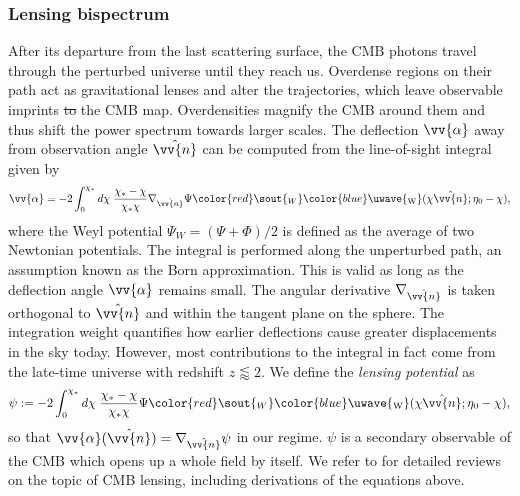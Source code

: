 \documentclass[a4paper,12pt,times,custombib,print,index]{Classes/PhDThesisPSnPDF} %
\providecommand{\DIFadd}[1]{{\protect\color{blue}\uwave{#1}}} %
\providecommand{\DIFdel}[1]{{\protect\color{red}\sout{#1}}}                      %
\providecommand{\DIFaddbegin}{} %
\providecommand{\DIFaddend}{} %
\providecommand{\DIFdelbegin}{} %
\providecommand{\DIFdelend}{} %
\newcommand{\DIFscaledelfig}{0.5}
\newlength{\DIFdelgraphicswidth} %
\newlength{\DIFdelgraphicsheight} %
\newcommand{\DIFaddincludegraphics}[2][]{{\color{blue}\fbox{\DIFOincludegraphics[#1]{#2}}}} %
\newcommand{\DIFdelincludegraphics}[2][]{%
\sbox{\DIFdelgraphicsbox}{\DIFOincludegraphics[#1]{#2}}%
\settoboxwidth{\DIFdelgraphicswidth}{\DIFdelgraphicsbox} %
\settoboxtotalheight{\DIFdelgraphicsheight}{\DIFdelgraphicsbox} %
\scalebox{\DIFscaledelfig}{%
\parbox[b]{\DIFdelgraphicswidth}{\usebox{\DIFdelgraphicsbox}\\[-\baselineskip] \rule{\DIFdelgraphicswidth}{0em}}\llap{\resizebox{\DIFdelgraphicswidth}{\DIFdelgraphicsheight}{%
\setlength{\unitlength}{\DIFdelgraphicswidth}%
\begin{picture}(1,1)%
\thicklines\linethickness{2pt} %
{\color[rgb]{1,0,0}\put(0,0){\framebox(1,1){}}}%
{\color[rgb]{1,0,0}\put(0,0){\line( 1,1){1}}}%
{\color[rgb]{1,0,0}\put(0,1){\line(1,-1){1}}}%
\end{picture}%
}\hspace*{3pt}}} %
} %
\DeclareRobustCommand{\DIFaddbegin}{\DIFOaddbegin \let\includegraphics\DIFaddincludegraphics} %
\DeclareRobustCommand{\DIFaddend}{\DIFOaddend \let\includegraphics\DIFOincludegraphics} %
\DeclareRobustCommand{\DIFdelbegin}{\DIFOdelbegin \let\includegraphics\DIFdelincludegraphics} %
\DeclareRobustCommand{\DIFdelend}{\DIFOaddend \let\includegraphics\DIFOincludegraphics} %
\begin{document}
\subsubsection*{Lensing bispectrum}

After its departure from the last scattering surface, the CMB photons travel through the perturbed universe until they reach us. Overdense regions on their path act as gravitational lenses and alter the trajectories, which leave observable imprints \DIFdelbegin \DIFdel{to }\DIFdelend \DIFaddbegin \DIFadd{on }\DIFaddend the CMB map. Overdensities magnify the CMB around them and thus shift the power spectrum towards larger scales. The deflection $\vv{\alpha}$ away from observation angle $\hat{\vv{n}}$ can be computed from the line-of-sight integral given by 
\begin{align}
	\vv{\alpha} = - 2\int_0^{\chi_*} d\chi \; \frac{\chi_* - \chi}{\chi_* \chi} \nabla_{\hat{\vv{n}}} \Psi\DIFdelbegin \DIFdel{_W }\DIFdelend \DIFaddbegin \DIFadd{_\text{W} }\DIFaddend (\chi\hat{\vv{n}}; \eta_0-\chi), 
\end{align}
where the Weyl potential \DIFdelbegin \DIFdel{$\Psi_W = (\Psi + \Phi)/2$ }\DIFdelend \DIFaddbegin \DIFadd{$\Psi_\text{W} = (\Psi + \Phi)/2$ }\DIFaddend is defined as the average of two Newtonian potentials. The integral is performed along the unperturbed path, an assumption known as the Born approximation. This is valid as long as the deflection angle $\vv{\alpha}$ remains small. The angular derivative $\nabla_{\hat{\vv{n}}}$ is taken orthogonal to $\hat{\vv{n}}$ and within the tangent plane on the sphere. The integration weight quantifies how earlier deflections cause greater displacements in the sky today. However, most contributions to the integral in fact come from the late-time universe with redshift $z\lessapprox2$. We define the \textit{lensing potential} as
\begin{align}
	\psi := - 2\int_0^{\chi_*} d\chi \; \frac{\chi_* - \chi}{\chi_* \chi}  \Psi\DIFdelbegin \DIFdel{_W }\DIFdelend \DIFaddbegin \DIFadd{_\text{W} }\DIFaddend (\chi\hat{\vv{n}}; \eta_0-\chi), \label{def:lensing_potential}
\end{align}
so that $\vv{\alpha}(\hat{\vv{n}}) = \nabla_{\hat{\vv{n}}} \psi$ in our regime. $\psi$ is a secondary observable of the CMB which opens up a whole field by itself. We refer to \cite{Bartelmann2001weaklensing,Lewis2006weaklensing,Hanson2010weaklensing} for detailed reviews on the topic of CMB lensing, including derivations of the equations above.
\end{document}
